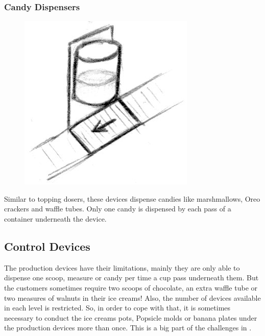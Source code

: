 \documentclass[a4paper]{scrartcl}
\begin{document}
        \subsubsection{Candy Dispensers}
            \begin{minipage}[t][6em][t]{\textwidth}
                \begin{figure}
                    \vspace{-20pt}
                    \includegraphics[scale=1]{devices/special_topping_doser}
                    \vspace{-20pt}
                \end{figure}

                Similar to topping dosers, these devices dispense candies like
                marshmallows, Oreo crackers and waffle tubes. Only one candy is
                dispensed by each pass of a container underneath the device.
            \end{minipage}

    \subsection{Control Devices}
        The production devices have their limitations, mainly they are only able
        to dispense one scoop, measure or candy per time a cup pass underneath
        them. But the customers sometimes require two scoops of chocolate, an
        extra waffle tube or two measures of walnuts in their ice creams! Also,
        the number of devices available in each level is restricted. So, in
        order to cope with that, it is sometimes necessary to conduct the ice
        creams pots, Popsicle molds or banana plates under the production
        devices more than once. This is a big part of the challenges in
        \gamename.
\end{document}
